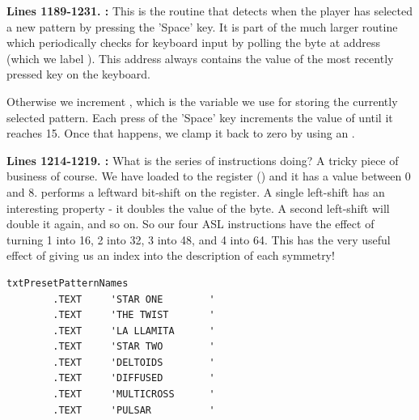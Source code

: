 \textbf{Lines 1189-1231. :} This is the routine that detects when the player has selected a new
pattern by pressing the 'Space' key. It is part of the much larger routine  which periodically checks
for keyboard input by polling the byte at address  (which we label ). This address always
contains the value of the most recently pressed key on the keyboard.

Otherwise we increment , which is the variable we use for storing the currently selected pattern.
Each press of the 'Space' key increments the value of  until it reaches 15. Once that happens, we 
clamp it back to zero by using an .

\textbf{Lines 1214-1219. :} What is the series of  instructions doing? A tricky
piece of business of course. We have loaded  to the  register () and it has a value between 0 and 8.
 performs a leftward bit-shift on the  register. A single left-shift has an interesting property - it doubles the
value of the byte. A second left-shift will double it again, and so on. So our four {ASL} instructions have the effect of turning 1 into
16, 2 into 32, 3 into 48, and 4 into 64. This has the very useful effect of giving us an index into the description of each symmetry!

\begin{lstlisting}
txtPresetPatternNames
        .TEXT     'STAR ONE        '
        .TEXT     'THE TWIST       '
        .TEXT     'LA LLAMITA      '
        .TEXT     'STAR TWO        '
        .TEXT     'DELTOIDS        '
        .TEXT     'DIFFUSED        '
        .TEXT     'MULTICROSS      '
        .TEXT     'PULSAR          '
\end{lstlisting}

